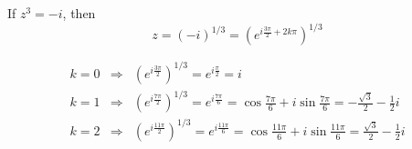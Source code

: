 \vspace{2mm}
If $z^3=-i$, then
$$
z=(-i)^{1/3}=\left(e^{i\frac{3\pi}{2}+2k\pi}\right)^{1/3}
$$

\begin{eqnarray*}
  k=0 &\Rightarrow &\left(e^{i\frac{3\pi}{2}}\right)^{1/3} = e^{i\frac{\pi}{2}}=i\\
	k=1 &\Rightarrow &\left(e^{i\frac{7\pi}{2}}\right)^{1/3} = e^{i\frac{7\pi}{6}}=\cos\frac{7\pi}{6}+i\sin\frac{7\pi}{6} = -\frac{\sqrt{3}}{2}-\frac{1}{2}i\\
  k=2 &\Rightarrow &\left(e^{i\frac{11\pi}{2}}\right)^{1/3} = e^{i\frac{11\pi}{6}}=\cos\frac{11\pi}{6}+i\sin\frac{11\pi}{6} = \frac{\sqrt{3}}{2}-\frac{1}{2}i\\
\end{eqnarray*}



